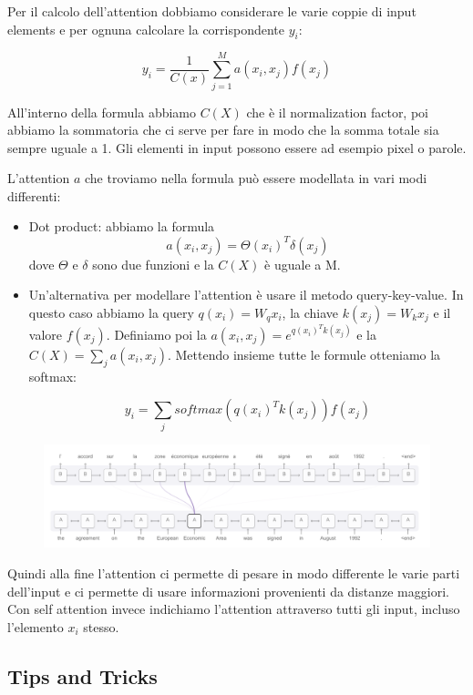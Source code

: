 \documentclass[14pt]{extreport}
\begin{document}
Per il calcolo dell'attention dobbiamo considerare le varie coppie di input elements e per ognuna calcolare
la corrispondente $y_i$:

$$y_i = \frac{1}{C(x)}\sum_{j=1}^M a(x_i,x_j)f(x_j)$$

All'interno della formula abbiamo $C(X)$ che è il normalization factor, poi abbiamo la sommatoria che ci serve per fare in modo che la somma totale sia sempre
uguale a 1. Gli elementi in input possono essere ad esempio pixel o parole.

L'attention $a$ che troviamo nella formula può essere modellata in vari modi differenti:
\begin{itemize}
\item Dot product: abbiamo la formula $$a(x_i, x_j) = \Theta(x_i)^T\delta(x_j)$$ dove $\Theta$ e $\delta$ sono due funzioni
e la $C(X)$ è uguale a M.
\item Un'alternativa per modellare l'attention è usare il metodo query-key-value.
In questo caso abbiamo la query $q(x_i) = W_qx_i$, la chiave $k(x_j)=W_kx_j$ e il valore $f(x_j)$.
Definiamo poi la $a(x_i,x_j) = e^{q(x_i)^Tk(x_j)}$ e la $C(X)=\sum_ja(x_i, x_j)$.
Mettendo insieme tutte le formule otteniamo la softmax:

$$y_i = \sum_j softmax(q(x_i)^Tk(x_j))f(x_j)$$
\end{itemize}

\begin{figure}[H]
\centering
\includegraphics[width=0.7\linewidth]{431.jpeg}
\end{figure}

Quindi alla fine l'attention ci permette di pesare in modo differente le varie parti dell'input 
e ci permette di usare informazioni provenienti da distanze maggiori.
Con self attention invece indichiamo l'attention attraverso tutti gli input, incluso l'elemento $x_i$ stesso.

\subsection{Tips and Tricks}
\end{document}
